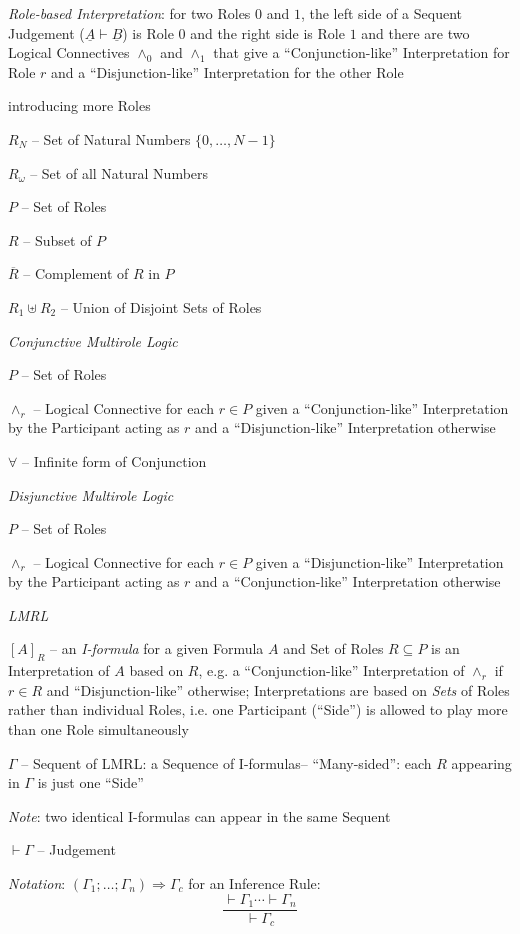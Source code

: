 \emph{Role-based Interpretation}: for two Roles $0$ and $1$, the left
side of a Sequent Judgement ($\underline{A} \vdash \underline{B}$) is
Role $0$ and the right side is Role $1$ and there are two Logical
Connectives $\wedge_0$ and $\wedge_1$ that give a ``Conjunction-like''
Interpretation for Role $r$ and a ``Disjunction-like'' Interpretation
for the other Role

introducing more Roles

$R_N$ -- Set of Natural Numbers $\{0,\ldots,N-1\}$

$R_\omega$ -- Set of all Natural Numbers

$P$ -- Set of Roles

$R$ -- Subset of $P$

$\overline{R}$ -- Complement of $R$ in $P$

$R_1 \uplus R_2$ -- Union of Disjoint Sets of Roles


\emph{Conjunctive Multirole Logic}

$P$ -- Set of Roles

$\wedge_r$ -- Logical Connective for each $r \in P$ given a
``Conjunction-like'' Interpretation by the Participant acting as $r$
and a ``Disjunction-like'' Interpretation otherwise

$\forall$ -- Infinite form of Conjunction


\emph{Disjunctive Multirole Logic}

$P$ -- Set of Roles

$\wedge_r$ -- Logical Connective for each $r \in P$ given a
``Disjunction-like'' Interpretation by the Participant acting as $r$
and a ``Conjunction-like'' Interpretation otherwise


\emph{LMRL}

$[A]_R$ -- an \emph{I-formula} for a given Formula $A$ and Set of
Roles $R \subseteq P$ is an Interpretation of $A$ based on $R$, e.g. a
``Conjunction-like'' Interpretation of $\wedge_r$ if $r \in R$ and
``Disjunction-like'' otherwise; Interpretations are based on
\emph{Sets} of Roles rather than individual Roles, i.e. one
Participant (``Side'') is allowed to play more than one Role
simultaneously

$\Gamma$ -- Sequent of LMRL: a Sequence of I-formulas--
``Many-sided'': each $R$ appearing in $\Gamma$ is just one ``Side''

\fist \emph{Note}: two identical I-formulas can appear in the same
Sequent

$\vdash \Gamma$ -- Judgement

\fist \emph{Notation}: $(\Gamma_1;\ldots;\Gamma_n) \Rightarrow
\Gamma_c$ for an Inference Rule:
\[
  \frac{\vdash \Gamma_1 \cdots \vdash \Gamma_n}{\vdash \Gamma_c}
\]

